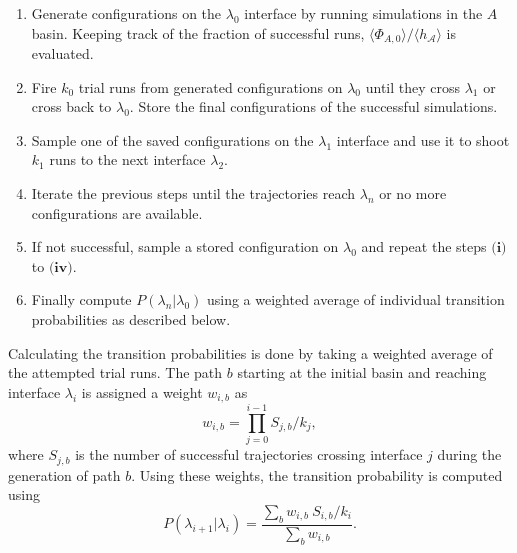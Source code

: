 \begin{enumerate}[label=\textbf{(\roman*)}]
   \item Generate configurations on the $\lambda_0$ interface by running
      simulations in the $A$ basin. Keeping track of the fraction of successful runs,
      $\langle\Phi_{A,0} \rangle/\langle h_{\mathcal{A}}\rangle$ is evaluated.
   \vspace{0.05cm}
   \item Fire $k_0$ trial runs from generated configurations on $\lambda_0$ until they
      cross $\lambda_1$ or cross back to $\lambda_0$. Store the final configurations of
      the successful simulations.
   \vspace{0.05cm}
   \item Sample one of the saved configurations on the $\lambda_1$ interface and use it
      to
      shoot $k_1$ runs to the next interface $\lambda_2$.
   \vspace{0.05cm}
   \item Iterate the previous steps until the trajectories reach $\lambda_n$ or no more
     configurations are available.
   \vspace{0.05cm}
   \item If not successful, sample a stored configuration on $\lambda_0$ and repeat the
      steps $\textbf{(i)}$ to $\textbf{(iv)}$.
   \vspace{0.05cm}
   \item Finally compute $P(\lambda_n|\lambda_0)$ using a weighted average of individual
     transition probabilities as described below.
\end{enumerate}
\newpage
Calculating the transition probabilities is done by taking a weighted average of the
attempted trial runs. The path $b$ starting at the initial basin and reaching
interface $\lambda_i$ is assigned a weight $w_{i,b}$ as
\begin{equation}
   w_{i,b} = \prod_{j=0}^{i-1} S_{j,b}/k_j,
\end{equation}
where $S_{j,b}$ is the number of successful trajectories crossing interface $j$ during
the generation of path $b$. Using these weights, the transition probability is computed
using
\begin{equation}
   P(\lambda_{i+1} | \lambda_i) = \frac{\sum_{b} w_{i,b}\ S_{i,b}/k_i}{\sum_b w_{i,b}}.
\end{equation}


